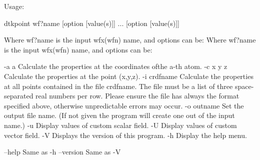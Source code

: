 

Usage:

	dtkpoint wf?name [option [value(s)]] ... [option [value(s)]]

Where wf?name is the input wfx(wfn) name, and options can be:
Where wf?name is the input wfx(wfn) name, and options can be:

  -a a      	Calculate the properties at the coordinates ofthe a-th atom.
  -c x y z  	Calculate the properties at the point (x,y,z).
  -i crdfname	Calculate the properties at all points contained
            	  in the file crdfname. The file must be a list of three 
            	  space-separated real numbers per row.
            	  Please ensure the file has always the format specified above,
            	  otherwise unpredictable errors may occur.
  -o outname	Set the output file name.
            	  (If not given the program will create one out of
            	  the input name.)
  -u     	Display values of custom scalar field.
  -U     	Display values of custom vector field.
  -V     	Displays the version of this program.
  -h     	Display the help menu.

  --help    		Same as -h
  --version 		Same as -V
